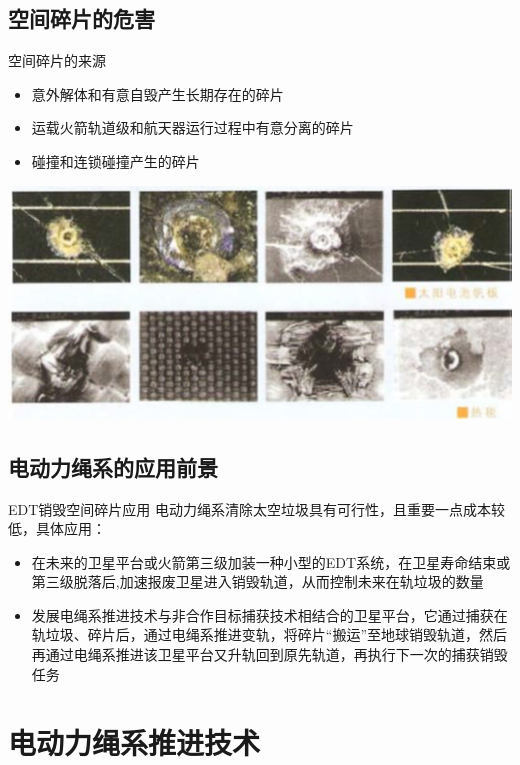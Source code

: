 \documentclass[sectioncirclenumberstyle]{le2iutbmbeamer}
\begin{document}
\subsection{空间碎片的危害}
\begin{frame}{空间碎片的来源}
\begin{itemize}
\item 意外解体和有意自毁产生长期存在的碎片
\item \alert{运载火箭轨道级和航天器运行过程中有意分离的碎片}
\item 碰撞和连锁碰撞产生的碎片
\end{itemize}
\includegraphics[width=\linewidth]{figures/debrisharm}
\end{frame}

\subsection{电动力绳系的应用前景}
\begin{frame}{EDT销毁空间碎片应用}
电动力绳系清除太空垃圾具有可行性，且重要一点成本较低，具体应用：
\begin{itemize}
\item 在未来的卫星平台或火箭第三级加装一种小型的EDT系统，在卫星寿命结束或第三级脱落后,加速报废卫星进入销毁轨道，从而控制未来在轨垃圾的数量
\item 发展电绳系推进技术与非合作目标捕获技术相结合的卫星平台，它通过捕获在轨垃圾、碎片后，通过电绳系推进变轨，将碎片“搬运”至地球销毁轨道，然后再通过电绳系推进该卫星平台又升轨回到原先轨道，再执行下一次的捕获销毁任务
\end{itemize}
\end{frame}
\section{电动力绳系推进技术}
\tableofcontentslide[sectionstyle={show/shaded},subsectionstyle={show/show/hide},subsubsectionstyle={hide/hide/hide/hide}]
\end{document}
